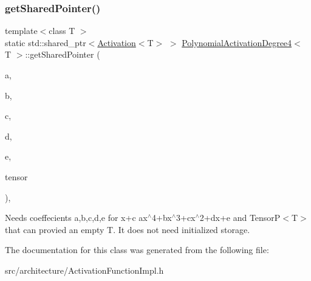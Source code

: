 \subsubsection{\texorpdfstring{get\+Shared\+Pointer()}{getSharedPointer()}}
{\footnotesize\ttfamily template$<$class T $>$ \\
static std\+::shared\+\_\+ptr$<$\hyperlink{classActivation}{Activation}$<$T$>$ $>$ \hyperlink{classPolynomialActivationDegree4}{Polynomial\+Activation\+Degree4}$<$ T $>$\+::get\+Shared\+Pointer (\begin{DoxyParamCaption}\item[{float}]{a,  }\item[{float}]{b,  }\item[{float}]{c,  }\item[{float}]{d,  }\item[{float}]{e,  }\item[{TensorP$<$ T $>$}]{tensor }\end{DoxyParamCaption})\hspace{0.3cm}{\ttfamily [inline]}, {\ttfamily [static]}}

Needs coeffecients a,b,c,d,e for x+c ax$^\wedge$4+bx$^\wedge$3+cx$^\wedge$2+dx+e and Tensor\+P$<$\+T$>$ that can provied an empty T. It does not need initialized storage. 

The documentation for this class was generated from the following file\+:\begin{DoxyCompactItemize}
\item 
src/architecture/Activation\+Function\+Impl.\+h\end{DoxyCompactItemize}
